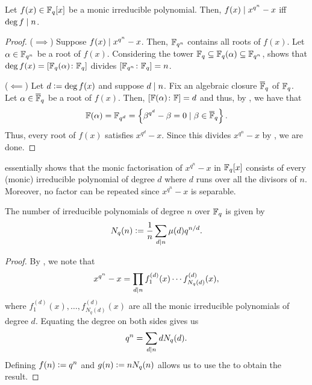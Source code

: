 \begin{lem} \label{lem:factorisation-of-x^q^n-x}
    Let $f(x) \in \mathbb{F}_q[x]$ be a monic irreducible polynomial. Then, $f(x) \mid x^{q^n} - x$ iff $\deg f \mid n$.
\end{lem}
\begin{proof}
    ($\implies$) Suppose $f(x) \mid x^{q^n} - x$. Then, $\mathbb{F}_{q^n}$ contains all roots of $f(x)$. Let $\alpha \in \mathbb{F}_{q^n}$ be a root of $f(x)$. Considering the tower $\mathbb{F}_q \subseteq \mathbb{F}_q(\alpha) \subseteq \mathbb{F}_{q^n}$, shows that $\deg f(x) = [\mathbb{F}_q(\alpha) \colon \mathbb{F}_q]$ divides $[\mathbb{F}_{q^n} \colon \mathbb{F}_q] = n$.
    
    ($\impliedby$) Let $d \vcentcolon= \deg f(x)$ and suppose $d \mid n$. Fix an algebraic closure $\overline{\mathbb{F}}_q$ of $\mathbb{F}_q$. Let $\alpha \in \overline{\mathbb{F}}_q$ be a root of $f(x)$. Then, $[\mathbb{F}(\alpha) \colon \mathbb{F}] = d$ and thus, by , we have that
    \[
        \mathbb{F}(\alpha) = \mathbb{F}_{q^d} = \left\{ \beta^{q^d} - \beta = 0 \mid \beta \in \overline{\mathbb{F}}_q \right\}.
    \]
    Thus, every root of $f(x)$ satisfies $x^{q^d} - x$. Since this divides $x^{q^n} - x$ by , we are done.
\end{proof}

\begin{rem}
     essentially shows that the monic factorisation of $x^{q^n} - x$ in $\mathbb{F}_q[x]$ consists of every (monic) irreducible polynomial of degree $d$ where $d$ runs over all the divisors of $n$. Moreover, no factor can be repeated since $x^{q^n} - x$ is separable.
\end{rem}

\begin{theorem} \label{thm:gauss-necklace}
    The number of irreducible polynomials of degree $n$ over $\mathbb{F}_q$ is given by
    \[
        N_q(n) \vcentcolon= \frac{1}{n} \sum_{d \mid n} \mu(d) q^{n/d}.
    \]
\end{theorem}
\begin{proof}
    By , we note that
    \[
        x^{q^n} - x = \prod_{d \mid n} f_1^{(d)}(x) \cdots f_{N_q(d)}^{(d)}(x),
    \]
    where $f_1^{(d)}(x), \ldots ,f_{N_q(d)}^{(d)}(x)$ are all the monic irreducible polynomials of degree $d$. Equating the degree on both sides gives us
    \[
        q^n = \sum_{d \mid n} d N_q(d).
    \]
    Defining $f(n) \vcentcolon = q^n$ and $g(n) \vcentcolon= nN_q(n)$ allows us to use the  to obtain the result.
\end{proof}

